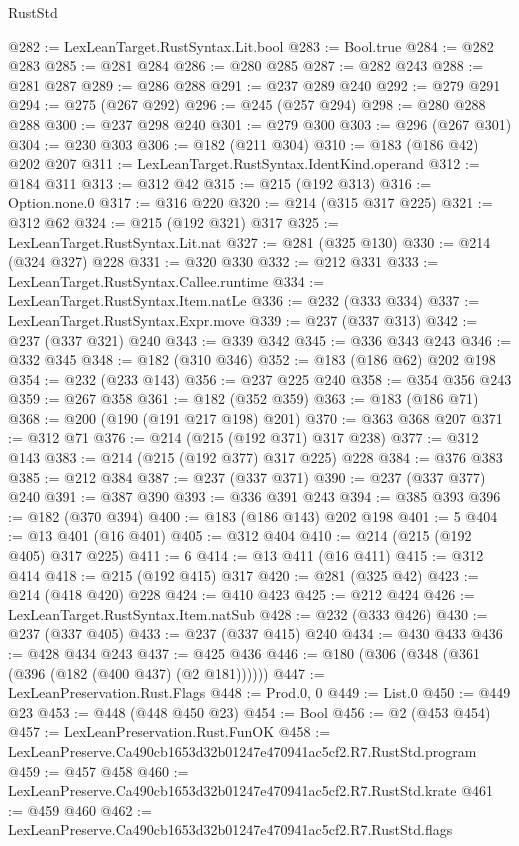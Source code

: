 \begin{lexlean}{RustStd}
\begin{coremodule}
@282 := LexLeanTarget.RustSyntax.Lit.bool
@283 := Bool.true
@284 := @282 @283
@285 := @281 @284
@286 := @280 @285
@287 := @282 @243
@288 := @281 @287
@289 := @286 @288
@291 := @237 @289 @240
@292 := @279 @291
@294 := @275 (@267 @292)
@296 := @245 (@257 @294)
@298 := @280 @288 @288
@300 := @237 @298 @240
@301 := @279 @300
@303 := @296 (@267 @301)
@304 := @230 @303
@306 := @182 (@211 @304)
@310 := @183 (@186 @42) @202 @207
@311 := LexLeanTarget.RustSyntax.IdentKind.operand
@312 := @184 @311
@313 := @312 @42
@315 := @215 (@192 @313)
@316 := Option.none.{0}
@317 := @316 @220
@320 := @214 (@315 @317 @225)
@321 := @312 @62
@324 := @215 (@192 @321) @317
@325 := LexLeanTarget.RustSyntax.Lit.nat
@327 := @281 (@325 @130)
@330 := @214 (@324 @327) @228
@331 := @320 @330
@332 := @212 @331
@333 := LexLeanTarget.RustSyntax.Callee.runtime
@334 := LexLeanTarget.RustSyntax.Item.natLe
@336 := @232 (@333 @334)
@337 := LexLeanTarget.RustSyntax.Expr.move
@339 := @237 (@337 @313)
@342 := @237 (@337 @321) @240
@343 := @339 @342
@345 := @336 @343 @243
@346 := @332 @345
@348 := @182 (@310 @346)
@352 := @183 (@186 @62) @202 @198
@354 := @232 (@233 @143)
@356 := @237 @225 @240
@358 := @354 @356 @243
@359 := @267 @358
@361 := @182 (@352 @359)
@363 := @183 (@186 @71)
@368 := @200 (@190 (@191 @217 @198) @201)
@370 := @363 @368 @207
@371 := @312 @71
@376 := @214 (@215 (@192 @371) @317 @238)
@377 := @312 @143
@383 := @214 (@215 (@192 @377) @317 @225) @228
@384 := @376 @383
@385 := @212 @384
@387 := @237 (@337 @371)
@390 := @237 (@337 @377) @240
@391 := @387 @390
@393 := @336 @391 @243
@394 := @385 @393
@396 := @182 (@370 @394)
@400 := @183 (@186 @143) @202 @198
@401 := 5
@404 := @13 @401 (@16 @401)
@405 := @312 @404
@410 := @214 (@215 (@192 @405) @317 @225)
@411 := 6
@414 := @13 @411 (@16 @411)
@415 := @312 @414
@418 := @215 (@192 @415) @317
@420 := @281 (@325 @42)
@423 := @214 (@418 @420) @228
@424 := @410 @423
@425 := @212 @424
@426 := LexLeanTarget.RustSyntax.Item.natSub
@428 := @232 (@333 @426)
@430 := @237 (@337 @405)
@433 := @237 (@337 @415) @240
@434 := @430 @433
@436 := @428 @434 @243
@437 := @425 @436
@446 := @180 (@306 (@348 (@361 (@396 (@182 (@400 @437) (@2 @181))))))
@447 := LexLeanPreservation.Rust.Flags
@448 := Prod.{0, 0}
@449 := List.{0}
@450 := @449 @23
@453 := @448 (@448 @450 @23)
@454 := Bool
@456 := @2 (@453 @454)
@457 := LexLeanPreservation.Rust.FunOK
@458 := LexLeanPreserve.Ca490cb1653d32b01247e470941ac5cf2.R7.RustStd.program
@459 := @457 @458
@460 := LexLeanPreserve.Ca490cb1653d32b01247e470941ac5cf2.R7.RustStd.krate
@461 := @459 @460
@462 := LexLeanPreserve.Ca490cb1653d32b01247e470941ac5cf2.R7.RustStd.flags

\end{coremodule}
\end{lexlean}
